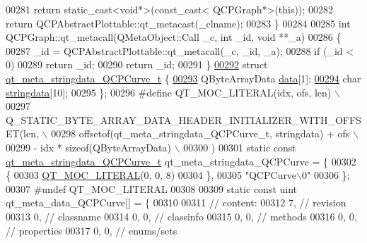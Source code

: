 \begin{DoxyCode}
00281         \textcolor{keywordflow}{return} \textcolor{keyword}{static\_cast<}\textcolor{keywordtype}{void}*\textcolor{keyword}{>}(\textcolor{keyword}{const\_cast<} QCPGraph*\textcolor{keyword}{>}(\textcolor{keyword}{this}));
00282     \textcolor{keywordflow}{return} QCPAbstractPlottable::qt\_metacast(\_clname);
00283 \}
00284 
00285 \textcolor{keywordtype}{int} QCPGraph::qt\_metacall(QMetaObject::Call \_c, \textcolor{keywordtype}{int} \_id, \textcolor{keywordtype}{void} **\_a)
00286 \{
00287     \_id = QCPAbstractPlottable::qt\_metacall(\_c, \_id, \_a);
00288     \textcolor{keywordflow}{if} (\_id < 0)
00289         \textcolor{keywordflow}{return} \_id;
00290     \textcolor{keywordflow}{return} \_id;
00291 \}
\hypertarget{a00016_source_l00292}{}\hyperlink{a00016}{00292} \textcolor{keyword}{struct }\hyperlink{a00016_d9/dcc/a00102}{qt\_meta\_stringdata\_QCPCurve\_t} \{
\hypertarget{a00016_source_l00293}{}\hyperlink{a00016_ac2243b1095d588f9864242ffc67f432f}{00293}     QByteArrayData \hyperlink{a00016_ac2243b1095d588f9864242ffc67f432f}{data}[1];
\hypertarget{a00016_source_l00294}{}\hyperlink{a00016_ad141d5092cc25ae43c6c60a782ca04ee}{00294}     \textcolor{keywordtype}{char} \hyperlink{a00016_ad141d5092cc25ae43c6c60a782ca04ee}{stringdata}[10];
00295 \};
00296 \textcolor{preprocessor}{#define QT\_MOC\_LITERAL(idx, ofs, len) \(\backslash\)}
00297 \textcolor{preprocessor}{    Q\_STATIC\_BYTE\_ARRAY\_DATA\_HEADER\_INITIALIZER\_WITH\_OFFSET(len, \(\backslash\)}
00298 \textcolor{preprocessor}{    offsetof(qt\_meta\_stringdata\_QCPCurve\_t, stringdata) + ofs \(\backslash\)}
00299 \textcolor{preprocessor}{        - idx * sizeof(QByteArrayData) \(\backslash\)}
00300 \textcolor{preprocessor}{    )}
00301 \textcolor{keyword}{static} \textcolor{keyword}{const} \hyperlink{a00016_d9/dcc/a00102}{qt\_meta\_stringdata\_QCPCurve\_t} qt\_meta\_stringdata\_QCPCurve = \{
00302     \{
00303 \hyperlink{a00016_a75bb9482d242cde0a06c9dbdc6b83abe}{QT\_MOC\_LITERAL}(0, 0, 8)
00304     \},
00305     \textcolor{stringliteral}{"QCPCurve\(\backslash\)0"}
00306 \};
00307 \textcolor{preprocessor}{#undef QT\_MOC\_LITERAL}
00308 
00309 \textcolor{keyword}{static} \textcolor{keyword}{const} uint qt\_meta\_data\_QCPCurve[] = \{
00310 
00311  \textcolor{comment}{// content:}
00312        7,       \textcolor{comment}{// revision}
00313        0,       \textcolor{comment}{// classname}
00314        0,    0, \textcolor{comment}{// classinfo}
00315        0,    0, \textcolor{comment}{// methods}
00316        0,    0, \textcolor{comment}{// properties}
00317        0,    0, \textcolor{comment}{// enums/sets}

\end{DoxyCode}
